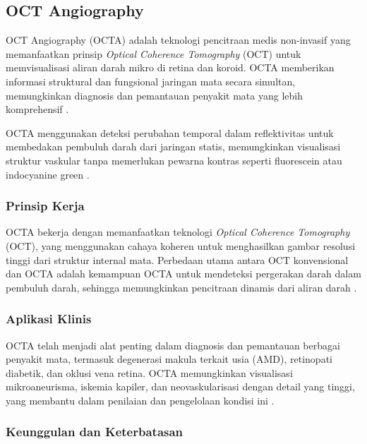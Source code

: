 

\subsection{OCT Angiography}
\label{sec:222}

OCT Angiography (OCTA) adalah teknologi pencitraan medis non-invasif yang memanfaatkan prinsip \emph{Optical Coherence Tomography} (OCT) untuk memvisualisasi aliran darah mikro di retina dan koroid. OCTA memberikan informasi struktural dan fungsional jaringan mata secara simultan, memungkinkan diagnosis dan pemantauan penyakit mata yang lebih komprehensif \parencite{Kashani2017-hn}.

OCTA menggunakan deteksi perubahan temporal dalam reflektivitas untuk membedakan pembuluh darah dari jaringan statis, memungkinkan visualisasi struktur vaskular tanpa memerlukan pewarna kontras seperti fluorescein atau indocyanine green \parencite{jia2012split}.

\subsubsection{Prinsip Kerja}

OCTA bekerja dengan memanfaatkan teknologi \emph{Optical Coherence Tomography} (OCT), yang menggunakan cahaya koheren untuk menghasilkan gambar resolusi tinggi dari struktur internal mata. Perbedaan utama antara OCT konvensional dan OCTA adalah kemampuan OCTA untuk mendeteksi pergerakan darah dalam pembuluh darah, sehingga memungkinkan pencitraan dinamis dari aliran darah \parencite{spaide2018choriocapillaris}.

\subsubsection{Aplikasi Klinis}

OCTA telah menjadi alat penting dalam diagnosis dan pemantauan berbagai penyakit mata, termasuk degenerasi makula terkait usia (AMD), retinopati diabetik, dan oklusi vena retina. OCTA memungkinkan visualisasi mikroaneurisma, iskemia kapiler, dan neovaskularisasi dengan detail yang tinggi, yang membantu dalam penilaian dan pengelolaan kondisi ini \parencite{de2016optical}.

\subsubsection{Keunggulan dan Keterbatasan}

